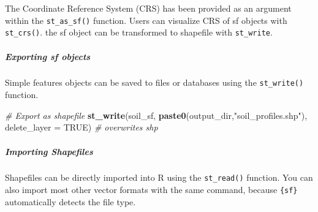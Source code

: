 \documentclass[
  10pt,
  b5paper,
  oneside]{book}
\newenvironment{Shaded}{\begin{snugshade}}{\end{snugshade}}
\newcommand{\AttributeTok}[1]{\textcolor[rgb]{0.13,0.29,0.53}{#1}}
\newcommand{\CommentTok}[1]{\textcolor[rgb]{0.56,0.35,0.01}{\textit{#1}}}
\newcommand{\ConstantTok}[1]{\textcolor[rgb]{0.56,0.35,0.01}{#1}}
\newcommand{\DecValTok}[1]{\textcolor[rgb]{0.00,0.00,0.81}{#1}}
\newcommand{\FunctionTok}[1]{\textcolor[rgb]{0.13,0.29,0.53}{\textbf{#1}}}
\newcommand{\NormalTok}[1]{#1}
\newcommand{\OtherTok}[1]{\textcolor[rgb]{0.56,0.35,0.01}{#1}}
\newcommand{\SpecialCharTok}[1]{\textcolor[rgb]{0.81,0.36,0.00}{\textbf{#1}}}
\newcommand{\StringTok}[1]{\textcolor[rgb]{0.31,0.60,0.02}{#1}}
\begin{document}
\begin{Shaded}
\end{Shaded}

The Coordinate Reference System (CRS) has been provided as an argument within the \texttt{st\_as\_sf()} function. Users can visualize CRS of sf objects with \texttt{st\_crs()}. the sf object can be transformed to shapefile with \texttt{st\_write}.

\subparagraph*{Exporting sf objects}\label{exporting-sf-objects}

Simple features objects can be saved to files or databases using the \texttt{st\_write()} function.

\begin{Shaded}
\begin{Highlighting}[]
\CommentTok{\# Export as shapefile}
\FunctionTok{st\_write}\NormalTok{(soil\_sf, }\FunctionTok{paste0}\NormalTok{(output\_dir,}\StringTok{"soil\_profiles.shp"}\NormalTok{), }\AttributeTok{delete\_layer =} \ConstantTok{TRUE}\NormalTok{) }\CommentTok{\# overwrites shp}
\end{Highlighting}
\end{Shaded}

\subparagraph*{Importing Shapefiles}\label{importing-shapefiles}

Shapefiles can be directly imported into R using the \texttt{st\_read()} function. You can also import most other vector formats with the same command, because \texttt{\{sf\}} automatically detects the file type.
\end{document}
